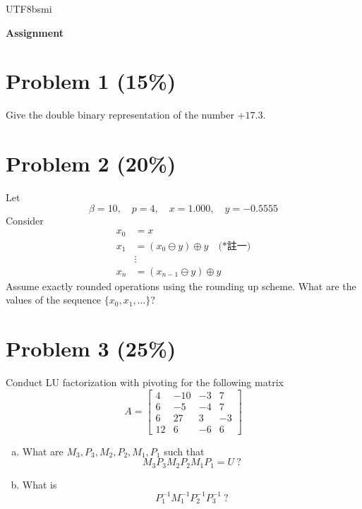 \documentclass[12pt,a4paper]{article}
\begin{document}
\begin{CJK*}{UTF8}{bsmi} %

\begin{center}
    \Large \textbf{Assignment}
\end{center}

\vspace{0.5cm}

\section*{Problem 1 (15\%)}
Give the double binary representation of the number $+17.3$.

\vspace{0.5cm}

\section*{Problem 2 (20\%)}
Let
\[ \beta=10, \quad p=4, \quad x=1.000, \quad y=-0.5555 \]
Consider
\begin{align*}
x_0 &= x \\
x_1 &= (x_0 \ominus y) \oplus y \quad \text{(*註一)} \\
&\vdots \\
x_n &= (x_{n-1} \ominus y) \oplus y
\end{align*}
Assume exactly rounded operations using the rounding up scheme. What are the values of the sequence $\{x_0, x_1, \dots\}$?

\vspace{0.5cm}

\section*{Problem 3 (25\%)}
Conduct LU factorization with pivoting for the following matrix
\[
A = \begin{bmatrix}
4 & -10 & -3 & 7 \\
6 & -5 & -4 & 7 \\
6 & 27 & 3 & -3 \\
12 & 6 & -6 & 6
\end{bmatrix}
\]

\begin{enumerate}[(a)]
    \item What are $M_3, P_3, M_2, P_2, M_1, P_1$ such that
    \[ M_3 P_3 M_2 P_2 M_1 P_1 = U \ ? \]
    
    \item What is
    \[ P_1^{-1} M_1^{-1} P_2^{-1} P_3^{-1} \ ? \]
    

\end{enumerate}
\end{CJK*}
\end{document}
